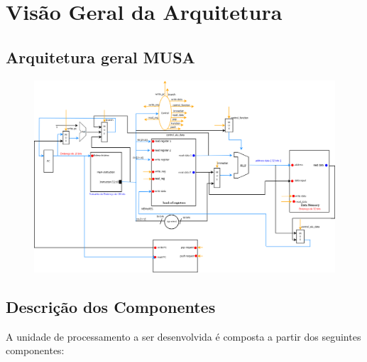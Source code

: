 \documentclass{report}
\begin{document}
\chapter{Visão Geral da Arquitetura}
  \section{Arquitetura geral MUSA}
  \begin{figure}[H]
	\centering
	\includegraphics[width=\linewidth]{./pictures/datapaths/Arquitetura/DataPath.png}
  \end{figure}  

  \section{Descrição dos Componentes}
  A unidade de processamento a ser desenvolvida é composta a partir dos seguintes componentes:
  
\end{document}
